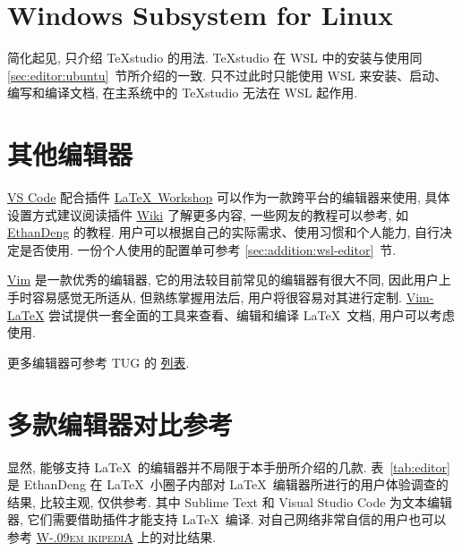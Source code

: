 \section{Windows Subsystem for Linux}\label{sec:editor:wsl}

简化起见,
只介绍 \TeX studio 的用法.
\TeX studio 在 WSL 中的安装与使用同 \ref{sec:editor:ubuntu}~节所介绍的一致.
只不过此时只能使用 WSL 来安装、启动、编写和编译文档,
在主系统中的 \TeX studio 无法在 WSL 起作用.

\section{其他编辑器}

\href{https://code.visualstudio.com/}{VS Code}
配合插件
\href{https://marketplace.visualstudio.com/items?itemName=James-Yu.latex-workshop}{\LaTeX\ Workshop}
可以作为一款跨平台的编辑器来使用,
具体设置方式建议阅读插件
\href{https://github.com/James-Yu/LaTeX-Workshop/wiki}{Wiki}
了解更多内容,
一些网友的教程可以参考,
如
\href{https://github.com/EthanDeng/vscode-latex}{EthanDeng}
的教程.
用户可以根据自己的实际需求、使用习惯和个人能力,
自行决定是否使用.
一份个人使用的配置单可参考 \ref{sec:addition:wsl-editor}~节.

\href{https://www.vim.org/}{Vim} 是一款优秀的编辑器,
它的用法较目前常见的编辑器有很大不同,
因此用户上手时容易感觉无所适从,
但熟练掌握用法后,
用户将很容易对其进行定制.
\href{http://vim-latex.sourceforge.net/}{Vim-LaTeX}
尝试提供一套全面的工具来查看、编辑和编译 \LaTeX\ 文档,
用户可以考虑使用.

更多编辑器可参考 TUG 的%
\href{https://tug.org/interest.html#editors}{列表}.

\section{多款编辑器对比参考}

显然, 能够支持 \LaTeX\ 的编辑器并不局限于本手册所介绍的几款.
表~\ref{tab:editor} 是 EthanDeng
在 \LaTeX\ 小圈子内部对 \LaTeX\ 编辑器所进行的用户体验调查的结果,
比较主观, 仅供参考.
其中 Sublime Text 和 Visual Studio Code 为文本编辑器,
它们需要借助插件才能支持 \LaTeX\ 编译.
对自己网络非常自信的用户也可以参考
\href{https://en.wikipedia.org/wiki/Comparison_of_TeX_editors}{\textsc{W\kern-.09em ikipediA}}
上的对比结果.

